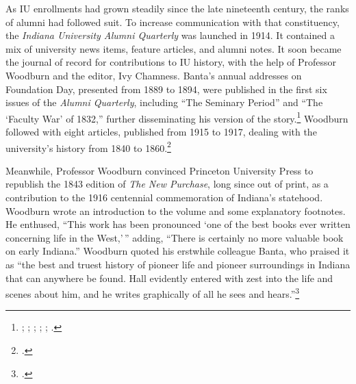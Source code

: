 \documentclass[
  american,
  letterpaper,
]{scrreprt}
\begin{document}
As IU enrollments had grown steadily since the late nineteenth century,
the ranks of alumni had followed suit. To increase communication with
that constituency, the \emph{Indiana University Alumni Quarterly} was
launched in 1914. It contained a mix of university news items, feature
articles, and alumni notes. It soon became the journal of record for
contributions to IU history, with the help of Professor Woodburn and the
editor, Ivy Chamness. Banta's annual addresses on Foundation Day,
presented from 1889 to 1894, were published in the first six issues of
the \emph{Alumni Quarterly}, including ``The Seminary Period'' and ``The
`Faculty War' of 1832,'' further disseminating his version of the
story.\footnote{; ; ;
  ; ; .}
Woodburn followed with eight articles, published from 1915 to 1917,
dealing with the university's history from 1840 to 1860.\footnote{.}

Meanwhile, Professor Woodburn convinced Princeton University Press to
republish the 1843 edition of \emph{The New Purchase}, long since out of
print, as a contribution to the 1916 centennial commemoration of
Indiana's statehood. Woodburn wrote an introduction to the volume and
some explanatory footnotes. He enthused, ``This work has been pronounced
`one of the best books ever written concerning life in the West,'\,''
adding, ``There is certainly no more valuable book on early Indiana.''
Woodburn quoted his erstwhile colleague Banta, who praised it as ``the
best and truest history of pioneer life and pioneer surroundings in
Indiana that can anywhere be found. Hall evidently entered with zest
into the life and scenes about him, and he writes graphically of all he
sees and hears.''\footnote{.}
\end{document}
